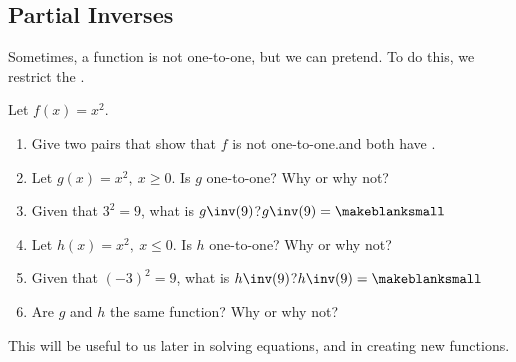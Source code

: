 \subsection{Partial Inverses} 
Sometimes, a function is not one-to-one, but we can pretend. To do this, we restrict the \makeblank.
\begin{Example}
Let $f(x)=x^2$.
\begin{enumerate}\setabc
\item Give two pairs that show that $f$ is not one-to-one.\lbr\blankpair and \blankpair both have \makeblank[1in].
\item Let $g(x)=x^2,\ x\geq 0$. Is $g$ one-to-one? Why or why not?\makeblanknew
\item Given that $3^2=9$, what is $g\inv(9)$?\lbr$g\inv(9)=\makeblanksmall$
\item Let $h(x)=x^2,\ x\leq 0$. Is $h$ one-to-one? Why or why not?\makeblanknew
\item Given that $(-3)^2=9$, what is $h\inv(9)$?\lbr$h\inv(9)=\makeblanksmall$
\item Are $g$ and $h$ the same function? Why or why not?\makeblanknew
\end{enumerate}
\end{Example}
\noindent
This will be useful to us later in solving equations, and in creating new functions.